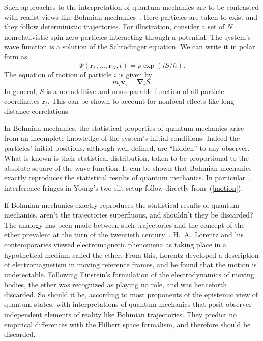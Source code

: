\documentclass[12pt]{article}
\begin{document}
Such approaches to the interpretation of quantum mechanics
are to be contrasted with realist views like Bohmian
mechanics~\cite{bohm}.  Here particles are taken to
exist and they follow deterministic trajectories.
For illustration, consider a set of $N$ nonrelativistic
spin-zero particles interacting through a potential.
The system's wave function is a solution of the
Schr\"{o}dinger equation.  We can write it in polar
form as
%
\begin{equation}
\Psi (\mathbf{r}_1, \ldots, \mathbf{r}_N, t)
= \rho \exp (i S /\hbar) .
\end{equation}
%
The equation of motion of particle $i$ is given by
%
\begin{equation}
m_i \mathbf{v}_i = \boldsymbol{\nabla}_i S .
\label{motion}
\end{equation}
%
In general, $S$ is a nonadditive and nonseparable
function of all particle coordinates $\mathbf{r}_i$.
This can be shown to account for nonlocal effects
like long-distance correlations.

In Bohmian mechanics, the statistical properties
of quantum mechanics arise from an incomplete
knowledge of the system's initial conditions.  Indeed
the particles' initial positions, although well-defined,
are ``hidden'' to any observer.  What is known is their
statistical distribution, taken to be proportional
to the absolute square of the wave function.  It
can be shown that Bohmian mechanics exactly
reproduces the statistical results of quantum
mechanics.  In particular~\cite{philippidis},
interference fringes in Young's two-slit setup follow
directly from~(\ref{motion}).

If Bohmian mechanics exactly reproduces the statistical
results of quantum mechanics, aren't the trajectories
superfluous, and shouldn't they be discarded?
The analogy has been made between such trajectories
and the concept of the ether prevalent at the turn
of the twentieth century~\cite{bub1,bub2}.
H.~A.~Lorentz and his contemporaries
viewed electromagnetic phenomena as taking place
in a hypothetical medium called the ether.  From
this, Lorentz developed a description of
electromagnetism in moving reference frames,
and he found that the motion is
undetectable.  Following Einstein's formulation of
the electrodynamics of moving
bodies, the ether was recognized as
playing no role, and was henceforth discarded.
So should it be, according to most proponents of the
epistemic view of quantum states, with interpretations
of quantum mechanics that posit observer-independent
elements of reality like Bohmian trajectories.
They predict no empirical differences
with the Hilbert space formalism, and therefore
should be discarded.
%
\end{document}
